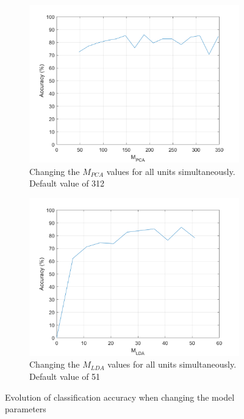 \documentclass[10pt,technote]{IEEEtran}
\begin{document}
\begin{figure}[htb!]
    \centering
    \begin{subfigure}[b]{0.5\textwidth}
        \includegraphics[width=\textwidth]{../results/ex2LDAEnsemble/acc_vs_mpca.png}
        \caption{Changing the $M_{PCA}$ values for all units simultaneously. Default value of 312}
        
        \quad
    \end{subfigure}
    \begin{subfigure}[b]{0.5\textwidth}
        \includegraphics[width=\textwidth]{../results/ex2LDAEnsemble/acc_vs_mlda.png}
        \caption{Changing the $M_{LDA}$ values for all units simultaneously. Default value of 51}
        
        \quad
    \end{subfigure}
    \caption{Evolution of classification accuracy when changing the model parameters}
    \label{fig:mld_acc}
\end{figure}
\end{document}
